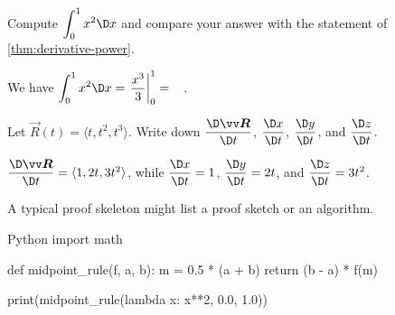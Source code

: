 \begin{exercise}[Warm-up]
Compute $\dint_0^1 x^2\dx$ and compare your answer with the statement of \cref{thm:derivative-power}.

\begin{solution}
We have $\dint_0^1 x^2\dx = \left.\frac{x^3}{3}\right\vert_{0}^{1}=\tsol{\frac13}$.
\end{solution}
\end{exercise}

\begin{exercise}[Vectors]
Let $\vec{R}(t)=\langle t,t^2,t^3\rangle$. Write down $\dvRdt$, $\dxdt$, $\dydt$, and $\dzdt$.

\begin{solution}
$\dvRdt=\langle 1,2t,3t^2\rangle$, while $\dxdt=1$, $\dydt=2t$, and $\dzdt=3t^2$.
\end{solution}
\end{exercise}

\begin{proofskeleton}
A typical proof skeleton might list a proof sketch or an algorithm.
\end{proofskeleton}

\begin{code}{Python}
import math

def midpoint_rule(f, a, b):
    m = 0.5 * (a + b)
    return (b - a) * f(m)

print(midpoint_rule(lambda x: x**2, 0.0, 1.0))
\end{code}
